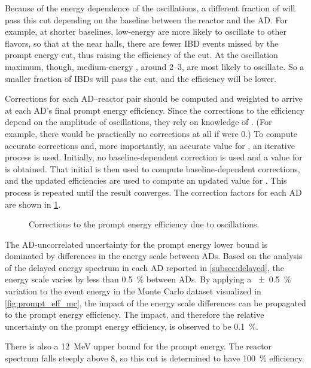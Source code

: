 Because of the energy dependence of the \nuebar{} oscillations,
a different fraction of \nuebar{} will pass this cut
depending on the baseline between the reactor and the AD.
For example, at shorter baselines, low-energy \nuebar{}
are more likely to oscillate to other flavors, so that at the near halls,
there are fewer IBD events missed by the prompt energy cut,
thus raising the efficiency of the cut.
At the oscillation maximum, though, medium-energy \nuebar{},
around \SIrange{2}{3}{\mev}, are most likely to oscillate.
So a smaller fraction of IBDs will pass the cut,
and the efficiency will be lower.

Corrections for each AD--reactor pair should be computed
and weighted to arrive at each AD's final prompt energy efficiency.
Since the corrections to the efficiency depend on
the amplitude of \nuebar{} oscillations, they rely on knowledge of \thetaot.
(For example, there would be practically no corrections at all if \thetaot{} were $0$.)
To compute accurate corrections and, more importantly, an accurate value
for \thetaot{}, an iterative process is used.
Initially, no baseline-dependent correction is used and
a value for \thetaot{} is obtained.
That initial \thetaot{} is then used to compute baseline-dependent corrections,
and the updated efficiencies are used to compute an updated value for \thetaot{}.
This process is repeated until the \thetaot{} result converges.
The correction factors for each AD are shown in \cref{fig:prompt_eff_osc}.

\begin{figure}
    \caption{Corrections to the prompt energy efficiency due to \nuebar{} oscillations.}
    \label{fig:prompt_eff_osc}
\end{figure}

The AD-uncorrelated uncertainty for the prompt energy lower bound
is dominated by differences in the energy scale between ADs.
Based on the analysis of the delayed energy spectrum in each AD
reported in \cref{subsec:delayed}, the energy scale
varies by less than \SI{0.5}{\percent} between ADs.
By applying a \SI{+-0.5}{\percent} variation to
the event energy in the Monte Carlo dataset visualized in \cref{fig:prompt_eff_mc},
the impact of the energy scale differences can be propagated
to the prompt energy efficiency.
The impact, and therefore the relative uncertainty on
the prompt energy efficiency, is observed to be \SI{0.1}{\percent}.

There is also a \SI{12}{\mega\electronvolt} upper bound for the prompt energy.
The reactor \nuebar{} spectrum falls steeply above \SI{8}{\mev},
so this cut is determined to have \SI{100}{\percent} efficiency.

